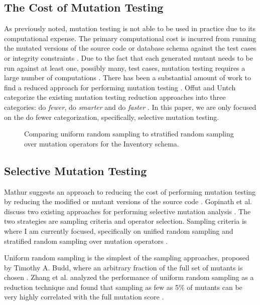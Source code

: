 \documentclass[conference]{IEEEtran}
\begin{document}
\subsection{The Cost of Mutation Testing}
As previously noted, mutation testing is not able
to be used in practice due to its computational expense.
The primary computational cost is incurred from running the mutated versions
of the source code or database schema against the test cases or integrity
constraints \cite{offutt1993experimental}. Due to the fact that each generated
mutant needs to be run against at least one, possibly many, test cases, mutation
testing requires a large number of computations \cite{offutt1993experimental}.
There has been a substantial amount of work to find a reduced approach
for performing mutation testing \cite{gopinath2015empirical, mcminnvirtual, gopinath2015mutation, offutt1993experimental}.
Offut and Untch categorize the existing mutation testing reduction approaches
into three categories: do \textit{fewer}, do \textit{smarter} and do \textit{faster} \cite{offutt1993experimental}.
In this paper, we are only focused on the do fewer categorization,
specifically, selective mutation testing.

\begin{figure*}[!ht]
\centering
{}
\hfil
{}
\caption{Comparing uniform random sampling to stratified random sampling over
mutation operators for the Inventory schema.}
\label{fig:comp}
\end{figure*}


\subsection{Selective Mutation Testing}
Mathur suggests an approach to reducing the cost of performing mutation testing by
reducing the modified or mutant versions of the source code \cite{mathur1991performance}.
Gopinath et al. discuss two existing approaches for performing selective
mutation analysis \cite{gopinath2015mutation}. The two strategies are
sampling criteria and operator selection. Sampling criteria is where I am
currently focused, specifically on unified random sampling and stratified
random sampling over mutation operators \cite{gopinath2015mutation}.

Uniform random sampling is the simplest of the sampling approaches, proposed by Timothy A. Budd,
where an arbitrary fraction of the full set of mutants is chosen \cite{budd1980mutation}.
Zhang et al. analyzed the performance of uniform random sampling as a reduction technique
and found that sampling as few as 5\% of mutants can be very highly correlated with the full mutation
score \cite{zhang2010operator, zhang2013operator}.
\end{document}
